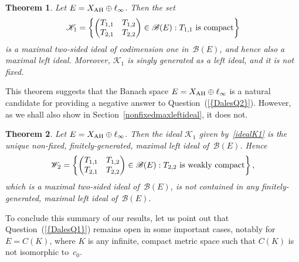 \documentclass[12pt]{amsart}
\newtheorem{theorem}{Theorem}[section]
\theoremstyle{definition}
\numberwithin{equation}{section}
\begin{document}
\begin{theorem}\label{Thmnonfixedmaxleftideal} Let
  $E=X_{\text{\normalfont{AH}}}\oplus\ell_\infty$. Then the set
  \begin{equation}\label{idealK1}
    \mathscr{K}_1 = \left\{\begin{pmatrix} T_{1,1} & T_{1,2}\\
        T_{2,1} & 
        T_{2,2} \end{pmatrix}\in\mathscr{B}(E) :
      T_{1,1}\ {\normalfont{\text{is compact}}}\right\} 
  \end{equation}  
  is a maximal two-sided ideal of codimension one in~$\mathscr{B}(E)$,
  and hence also a maximal left ideal. Moreover, $\mathscr{K}_1$ is
  singly generated as a left ideal, and it is not fixed.
\end{theorem}
This theorem suggests   that the Banach space
$E=X_{\text{\normalfont{AH}}}\oplus\ell_\infty$ is a natural candidate
for providing a negative answer to
Question~{{\normalfont\textrm{(\ref{{DalesQ2}})}}}. However, as we shall also show in
Section~\ref{nonfixedmaxleftideal}, it does not.
\begin{theorem}\label{Thmnonfixedmaxleftideal2} 
  Let $E=X_{\text{\normalfont{AH}}}\oplus\ell_\infty$. Then the ideal
  $\mathscr{K}_1$ given by~\eqref{idealK1} is the unique non-fixed,
  finitely-generated, maximal left ideal of~$\mathscr{B}(E)$.  Hence
  \begin{equation}\label{idealW2}
    \mathscr{W}_2 = \left\{\begin{pmatrix} T_{1,1} & T_{1,2}\\
        T_{2,1} & 
        T_{2,2} \end{pmatrix}\in\mathscr{B}(E) :
      T_{2,2}\ {\normalfont{\text{is weakly compact}}}\right\},
  \end{equation}  
  which is a maximal two-sided ideal of~$\mathscr{B}(E)$, is not
  contained in any finitely-generated, maximal left ideal
  of~$\mathscr{B}(E)$.
\end{theorem}

To conclude this summary of our results, let us point out that
Question~{{\normalfont\textrm{(\ref{{DalesQ1}})}}} remains open in some important cases,
notably for $E = C(K)$, where $K$ is any infinite, compact metric
space such that $C(K)$ is not isomorphic to~$c_0$. \smallskip
\end{document}
